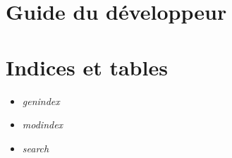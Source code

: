 \documentclass[letterpaper,10pt,english]{sphinxmanual}
\begin{document}
\chapter{Guide du développeur}
\label{guide:guide-du-developpeur}\label{guide::doc}

\chapter{Indices et tables}
\label{index:indices-et-tables}\begin{itemize}
\item {} 
\emph{genindex}

\item {} 
\emph{modindex}

\item {} 
\emph{search}

\end{itemize}



\renewcommand{\indexname}{Index}
\printindex
\end{document}
